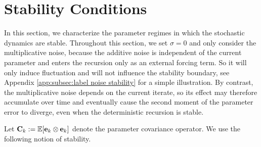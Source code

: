 \documentclass[11pt]{article}
\begin{document}

\section{Stability Conditions}
\label{sec:stability}
In this section, we characterize the parameter regimes in which the stochastic dynamics are stable. Throughout this section, we set \(\sigma=0\) and only consider the multiplicative noise, because the additive noise is independent of the current parameter and enters the recursion only as an external forcing term. So it will only induce fluctuation and will not influence the stability boundary, see Appendix \ref{app:subsec:label noise stability} for a simple illustration. By contrast, the multiplicative noise depends on the current iterate, so its effect may therefore accumulate over time and eventually cause the second moment of the parameter error to diverge, even when the deterministic recursion is stable.

Let
\(\mathbf{C}_k:=\mathbb{E}[\mathrm{\mathbf{e}}_k\otimes\mathrm{\mathbf{e}}_k]\)
denote the parameter covariance operator. We use the following notion of stability.
\end{document}
